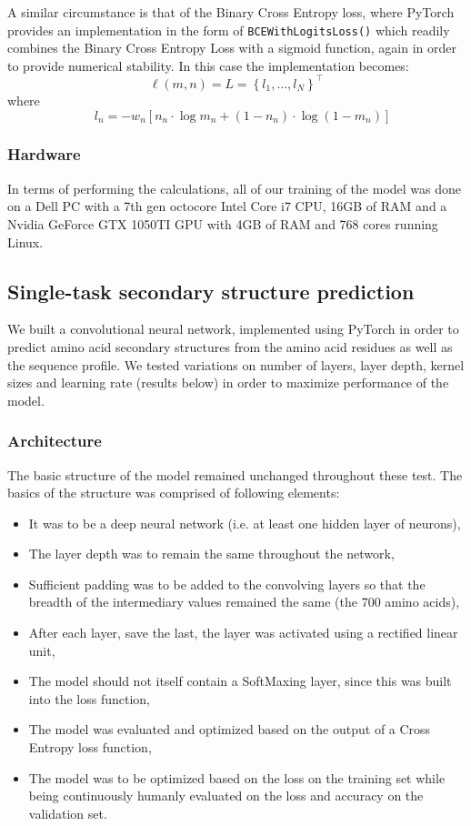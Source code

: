 \begin{multicols}{2}
\noindent A similar circumstance is that of the Binary Cross Entropy loss, where PyTorch provides an implementation in the form of \texttt{BCEWithLogitsLoss()} which readily combines the Binary Cross Entropy Loss with a sigmoid function, again in order to provide numerical stability. In this case the implementation becomes: \\
\[
\ell(m, n)=L=\left\{l_{1}, \ldots, l_{N}\right\}^{\top}
\]
where
\[ \quad l_{n}=-w_{n}\left[n_{n} \cdot \log m_{n}+\left(1-n_{n}\right) \cdot \log \left(1-m_{n}\right)\right]
\]

\subsubsection{Hardware}
In terms of performing the calculations, all of our training of the model was done on a Dell PC with a 7th gen octocore Intel Core i7 CPU, 16GB of RAM and a Nvidia GeForce GTX 1050TI GPU with 4GB of RAM and 768 cores running Linux.

\subsection{Single-task secondary structure prediction}
We built a convolutional neural network, implemented using PyTorch in order to predict amino acid secondary structures from the amino acid residues as well as the sequence profile. We tested variations on number of layers, layer depth, kernel sizes and learning rate (results below) in order to maximize performance of the model. 

\subsubsection{Architecture}

The basic structure of the model remained unchanged throughout these test. The basics of the structure was comprised of following elements:
\begin{itemize}
\item It was to be a deep neural network (i.e. at least one hidden layer of neurons),
\item The layer depth was to remain the same throughout the network,
\item Sufficient padding was to be added to the convolving layers so that the breadth of the intermediary values remained the same (the 700 amino acids),
\item After each layer, save the last, the layer was activated using a rectified linear unit,
\item The model should not itself contain a SoftMaxing layer, since this was built into the loss function,
\item The model was evaluated and optimized based on the output of a Cross Entropy loss function,
\item The model was to be optimized based on the loss on the training set while being continuously humanly evaluated on the loss and accuracy on the validation set.
\end{itemize}


\end{multicols}
